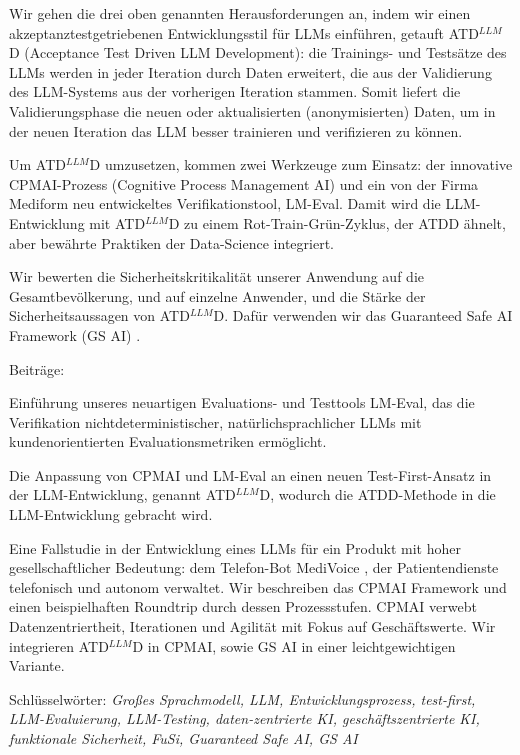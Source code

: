 \documentclass[twocolumn]{article}
\newcommand{\ATDLLMD}{ATD$^{LLM}$D}%
\begin{document}
Wir gehen die drei oben genannten Herausforderungen an, indem wir einen akzeptanztestgetriebenen Entwicklungsstil für LLMs einführen, getauft \ATDLLMD{} (Acceptance Test Driven LLM Development): die Trainings- und Testsätze des LLMs werden in jeder Iteration durch Daten erweitert, die aus der Validierung des LLM-Systems aus der vorherigen Iteration stammen.
Somit liefert die Validierungsphase die neuen oder aktualisierten (anonymisierten) Daten, um in der neuen Iteration das LLM besser trainieren und verifizieren zu können. 

Um \ATDLLMD{} umzusetzen, kommen zwei Werkzeuge zum Einsatz: der innovative CPMAI-Prozess (Cognitive Process Management AI) \cite{CPMAI} und ein von der Firma Mediform neu entwickeltes Verifikationstool, LM-Eval. Damit wird die LLM-Entwicklung mit \ATDLLMD{} zu einem Rot-Train-Grün-Zyklus, der ATDD ähnelt, aber bewährte Praktiken der Data-Science integriert.

Wir bewerten die Sicherheitskritikalität unserer Anwendung auf die Gesamtbevölkerung, und auf einzelne Anwender, und die Stärke der Sicherheitsaussagen von \ATDLLMD{}. %
Dafür verwenden wir das Guaranteed Safe AI Framework (GS AI) \cite{Dalrymple24}. 

Beiträge:
\begin{compactitem}
\item Einführung unseres neuartigen Evaluations- und Testtools LM-Eval, das die Verifikation nichtdeterministischer, natürlichsprachlicher LLMs mit kundenorientierten Evaluationsmetriken ermöglicht.
\item Die Anpassung von CPMAI und LM-Eval an einen neuen Test-First-Ansatz in der LLM-Entwicklung, genannt \ATDLLMD{}, wodurch die ATDD-Methode in die LLM-Entwicklung gebracht wird.
\item Eine Fallstudie in der Entwicklung eines LLMs für ein Produkt mit hoher gesellschaftlicher Bedeutung: dem Telefon-Bot MediVoice \cite{MediVoice}, der Patientendienste telefonisch und autonom verwaltet. Wir beschreiben das CPMAI Framework und einen beispielhaften Roundtrip durch dessen Prozessstufen. CPMAI verwebt Datenzentriertheit, Iterationen und Agilität mit Fokus auf Geschäftswerte. Wir integrieren \ATDLLMD{} in CPMAI, sowie GS AI in einer leichtgewichtigen Variante.
\end{compactitem}

Schlüsselwörter: \emph{Großes Sprachmodell, LLM, Entwicklungsprozess, test-first, LLM-Evaluierung, LLM-Testing, daten-zentrierte KI, geschäftszentrierte KI, funktionale Sicherheit, FuSi, Guaranteed Safe AI, GS AI}
\end{document}

